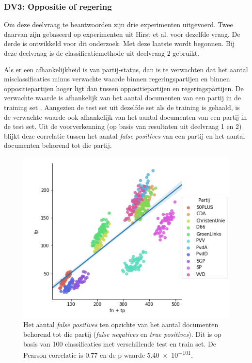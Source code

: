 \subsubsection{DV3: Oppositie of regering}

Om deze deelvraag te beantwoorden zijn drie experimenten uitgevoerd. Twee daarvan zijn gebaseerd op experimenten uit Hirst et al. \cite{Hirst_textto} voor dezelfde vraag. De derde is ontwikkeld voor dit onderzoek. Met deze laatste wordt begonnen. Bij deze deelvraag is de classificatiemethode uit deelvraag 2 gebruikt.\par
Als er een afhankelijkheid is van partij-status, dan is te verwachten dat het aantal misclassificaties minus verwachte waarde binnen regeringspartijen en binnen oppositiepartijen hoger ligt dan tussen oppositiepartijen en regeringspartijen. De verwachte waarde is afhankelijk van het aantal documenten van een partij in de training set \cite{Sahare}. Aangezien de test set uit dezelfde set als de training is gehaald, is de verwachte waarde ook afhankelijk van het aantal documenten van een partij in de test set. Uit de voorverkenning (op basis van resultaten uit deelvraag 1 en 2) blijkt deze correlatie tussen het aantal \textit{false positives} van een partij en het aantal documenten behorend tot die partij.
\begin{figure}[H]
  \centering
    \includegraphics[width=0.60\paperwidth]{Verslag/Handmatig/Correlation.png}
\caption{Het aantal \textit{false positives} ten opzichte van het aantal documenten behorend tot die partij (\textit{false negatives} en \textit{true positives}). Dit is op basis van 100 classificaties met verschillende test en train set. De Pearson correlatie is 0.77 en de p-waarde \num{5.40e-101}.}
\label{fig:correlation}
\end{figure}
